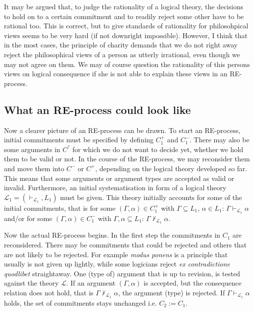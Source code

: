 \documentclass{article}
\begin{document}
It may be argued that, to judge the rationality of a logical theory, the decisions to hold on to a certain commitment and to readily reject some other have to be rational too. This is correct, but to give standards of rationality for philosohpical views seems to be very hard (if not downright impossible). However, I think that in the most cases, the principle of charity demands that we do not right away reject the philosophical views of a person as utterly irrational, even though we may not agree on them. We may of course question the rationality of this persons views on logical consequence if she is not able to explain these views in an RE-process.

\subsection{What an RE-process could look like}
Now a clearer picture of an RE-process can be drawn. To start an RE-process, initial commitments must be specified by defining $C_1^+$ and $C_1^-$. There may also be some arguments in $C^?$ for which we do not want to decide yet, whether we hold them to be valid or not. In the course of the RE-process, we may reconsider them and move them into $C^-$ or $C^+$, depending on the logical theory developed so far. This means that some arguments or  argument types are accepted as valid or invalid. Furthermore, an initial systematisation in form of a logical theory $\mathcal{L}_1=(\vdash_{\mathcal{L}_1},L_1)$ must be given. This theory initially accounts for some of the initial commitments, that is for some $(\Gamma,\alpha)\in C_1^+$ with $\Gamma\subseteq L_1$, $\alpha\in L_1$: $\Gamma\vdash_{\mathcal{L}_1}\alpha$ and/or for some $(\Gamma,\alpha)\in C_1^-$ with $\Gamma,\alpha\subseteq L_1$:  $\Gamma\nvdash_{\mathcal{L}_1}\alpha$. 

Now the actual RE-process begins. In the first step the commitments in $C_1$ are reconsidered. There may be commitments that could be rejected and others that are not likely to be rejected. For example \textit{modus ponens} is a principle that usually is not given up lightly, while some logicians reject \textit{ex contradictione quodlibet} straightaway. One (type of) argument that is up to revision, is tested against the theory $\mathcal{L}$. If an argument $(\Gamma,\alpha)$ is accepted, but the consequence relation does not hold, that is $\Gamma\nvdash_{\mathcal{L}_1}\alpha$, the argument (type) is rejected. If $\Gamma\vdash_{\mathcal{L}_1}\alpha$ holds, the set of commitments stays unchanged i.e. $C_2:=C_1$. 
\end{document}
